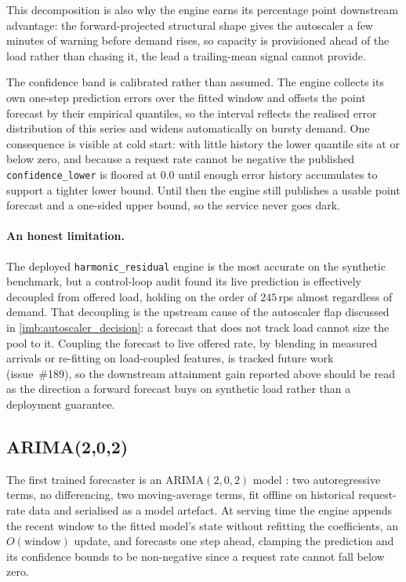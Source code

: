 This decomposition is also why the engine earns its \BMfcSlaGain{} percentage point
downstream advantage: the forward-projected structural shape gives the autoscaler a
few minutes of warning before demand rises, so capacity is provisioned ahead of the
load rather than chasing it, the lead a trailing-mean signal cannot provide.

The confidence band is calibrated rather than assumed. The engine collects its own
one-step prediction errors over the fitted window and offsets the point forecast by
their empirical quantiles, so the interval reflects the realised error distribution
of this series and widens automatically on bursty demand. One consequence is
visible at cold start: with little history the lower quantile sits at or below zero,
and because a request rate cannot be negative the published \texttt{confidence\_lower}
is floored at $0.0$ until enough error history accumulates to support a tighter
lower bound. Until then the engine still publishes a usable point forecast and a
one-sided upper bound, so the service never goes dark.

\paragraph{An honest limitation.} The deployed \texttt{harmonic\_residual} engine is the
most accurate on the synthetic benchmark, but a control-loop audit found its live
prediction is effectively decoupled from offered load, holding on the order of
$245$\,rps almost regardless of demand. That decoupling is the upstream cause of the
autoscaler flap discussed in \cref{imb:autoscaler_decision}: a forecast that does not
track load cannot size the pool to it. Coupling the forecast to live offered rate, by
blending in measured arrivals or re-fitting on load-coupled features, is tracked future
work (issue~\#189), so the downstream attainment gain reported above should be read as
the direction a forward forecast buys on synthetic load rather than a deployment
guarantee.

\subsection{ARIMA(2,0,2)}\label{imb:arima}

The first trained forecaster is an ARIMA$(2,0,2)$ model \cite{box2015timeseries}:
two autoregressive terms, no differencing, two moving-average terms, fit offline on
historical request-rate data and serialised as a model artefact. At serving time
the engine appends the recent window to the fitted model's state without refitting
the coefficients, an $O(\text{window})$ update, and forecasts one step ahead,
clamping the prediction and its confidence bounds to be non-negative since a
request rate cannot fall below zero.

